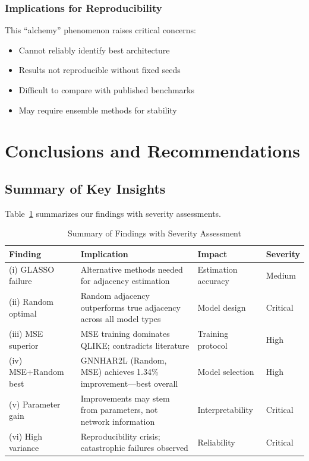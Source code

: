 \documentclass[10pt,a4paper]{article}
\begin{document}
\subsubsection{Implications for Reproducibility}

This ``alchemy'' phenomenon raises critical concerns:

\begin{itemize}
\item[\textcolor{red}{$\times$}] Cannot reliably identify best architecture
\item[\textcolor{red}{$\times$}] Results not reproducible without fixed seeds
\item[\textcolor{red}{$\times$}] Difficult to compare with published benchmarks
\item[\textcolor{red}{$\times$}] May require ensemble methods for stability
\end{itemize}

\section{Conclusions and Recommendations}

\subsection{Summary of Key Insights}

Table~\ref{tab:summary} summarizes our findings with severity assessments.

\begin{table}[H]
\centering
\caption{Summary of Findings with Severity Assessment}
\label{tab:summary}
\small
\begin{tabular}{@{}p{}p{}p{}p{}@{}}
\toprule
Finding & Implication & Impact & Severity \\
\midrule
(i) GLASSO failure & Alternative methods needed for adjacency estimation & Estimation accuracy & Medium \\
\midrule
(ii) Random optimal & Random adjacency outperforms true adjacency across all model types & Model design & Critical \\
\midrule
(iii) MSE superior & MSE training dominates QLIKE; contradicts literature & Training protocol & High \\
\midrule
(iv) MSE+Random best & GNNHAR2L (Random, MSE) achieves 1.34\% improvement---best overall & Model selection & High \\
\midrule
(v) Parameter gain & Improvements may stem from parameters, not network information & Interpretability & Critical \\
\midrule
(vi) High variance & Reproducibility crisis; catastrophic failures observed & Reliability & Critical \\
\bottomrule
\end{tabular}
\end{table}
\end{document}
